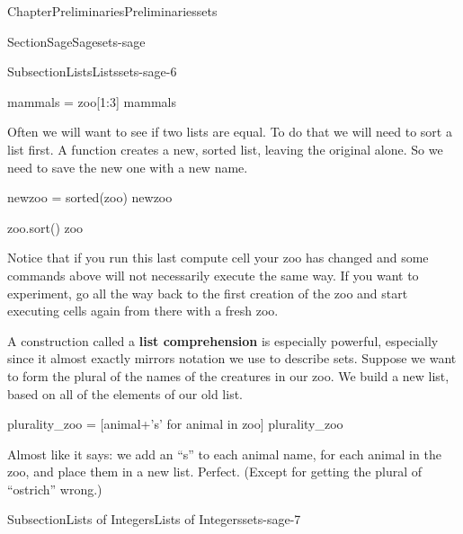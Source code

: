 \documentclass[oneside,10pt,]{book}
\newcommand{\terminology}[1]{\textbf{#1}}
\numberwithin{equation}{section}
\begin{document}
\begin{chapterptx}{Chapter}{Preliminaries}{}{Preliminaries}{}{}{sets}
\begin{sectionptx}{Section}{Sage}{}{Sage}{}{}{sets-sage}
\begin{subsectionptx}{Subsection}{Lists}{}{Lists}{}{}{sets-sage-6}
\begin{sageinput}
mammals = zoo[1:3]
mammals
\end{sageinput}
\begin{sageoutput}
\end{sageoutput}
Often we will want to see if two lists are equal.  To do that we will need to sort a list first.  A function creates a new, sorted list, leaving the original alone.  So we need to save the new one with a new name.%
\begin{sageinput}
newzoo = sorted(zoo)
newzoo
\end{sageinput}
\begin{sageoutput}
\end{sageoutput}
\begin{sageinput}
zoo.sort()
zoo
\end{sageinput}
\begin{sageoutput}
\end{sageoutput}
Notice that if you run this last compute cell your zoo has changed and some commands above will not necessarily execute the same way.  If you want to experiment, go all the way back to the first creation of the zoo and start executing cells again from there with a fresh zoo.%
\par
A construction called a \terminology{list comprehension} is especially powerful, especially since it almost exactly mirrors notation we use to describe sets.  Suppose we want to form the plural of the names of the creatures in our zoo.  We build a new list, based on all of the elements of our old list.%
\begin{sageinput}
plurality_zoo = [animal+'s' for animal in zoo]
plurality_zoo
\end{sageinput}
\begin{sageoutput}
\end{sageoutput}
Almost like it says: we add an ``s'' to each animal name, for each animal in the zoo, and place them in a new list.  Perfect.  (Except for getting the plural of ``ostrich'' wrong.)%
\end{subsectionptx}
%
%
\typeout{************************************************}
\typeout{************************************************}
%
\begin{subsectionptx}{Subsection}{Lists of Integers}{}{Lists of Integers}{}{}{sets-sage-7}

\end{subsectionptx}
\end{sectionptx}
\end{chapterptx}
\end{document}
